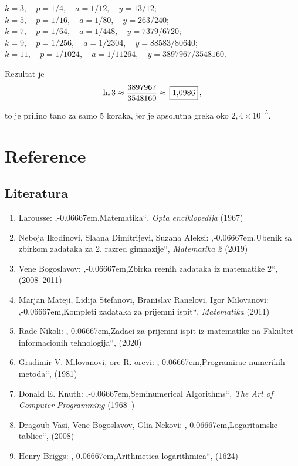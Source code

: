 \documentclass[12pt, twoside, a4paper]{article}
\def\navod#1{\relax,\kern-0.06667em,\relax#1\relax``\relax}
\def\puta{\times}
\def\.{{,}}
\def\ram#1{\,\fcolorbox{black}{white}{$\displaystyle{\mathstrut #1}$}\,}
\begin{document}
 $k=3,\quad p=1/4,\quad a=1/12,\quad y=13/12$;
 $k=5,\quad p=1/16,\quad a=1/80,\quad y=263/240$;
 $k=7,\quad p=1/64,\quad a=1/448,\quad y=7379/6720$;
 $k=9,\quad p=1/256,\quad a=1/2304,\quad y=88583/80640$;
 $k=11,\quad p=1/1024,\quad a=1/11264,\quad y=3897967/3548160$.

\medskip
\noindent Rezultat je
$$
\ln3\approx{3897967\over3548160}\approx \ram{1\.0986},
$$

\smallskip\noindent
{\sv}to je prili{\cv}no ta{\cv}no za samo 5 koraka, jer je apsolutna gre{\sv}ka oko $2\.4\puta10^{-5}$.



\section{Reference}

\subsection{Literatura}

\def\lit#1#2#3(#4){\item 
#1: \navod{#2}, {\sl#3\/} (#4)}
\renewcommand{\labelenumi}{[{\it\arabic{enumi}\/}]}

\begin{enumerate}
\lit{Larousse}{Matematika}{Op{\sv}ta enciklopedija}(1967)
\lit{Neboj{\sv}a Ikodinovi{\cc}, Sla{\dj}ana Dimitrijevi{\cc}, Suzana Aleksi{\cc}}{U{\dz}benik sa
zbirkom zadataka za 2. razred gimnazije}{Matematika 2}(2019)
\lit{Vene Bogoslavov}{Zbirka re\sv enih zadataka iz matematike 2}{}(2008--2011)
\lit{Marjan Mateji\cc, Lidija Stefanovi\cc, Branislav Ran\dj elovi\cc, Igor Milovanovi\cc}{Kom\-ple\-ti
zadataka za prijemni ispit}{Matematika}(2011)
\lit{Rade Nikoli{\cc}}{Zadaci za prijemni ispit iz matematike na Fakultet informacionih tehnologija}{}(2020)
\lit{Gradimir V. Milovanovi{\cc}, {\Dj}or{\dj}e R. {\Dj}or{\dj}evi{\cc}}{Programira{\nj}e numeri{\cv}kih metoda}{}(1981)
\lit{Donald E. Knuth}{Seminumerical Algorithms}{The Art of Computer Programming}(1968--)
\lit{Drago{\lj}ub Vasi{\cc}, Vene Bogoslavov, Gli{\sv}a Ne{\sv}kovi{\cc}}{Logaritamske tablice}{}(2008)
\lit{Henry Briggs}{Arithmetica logarithmica}{}(1624)
\end{enumerate}
\end{document}
